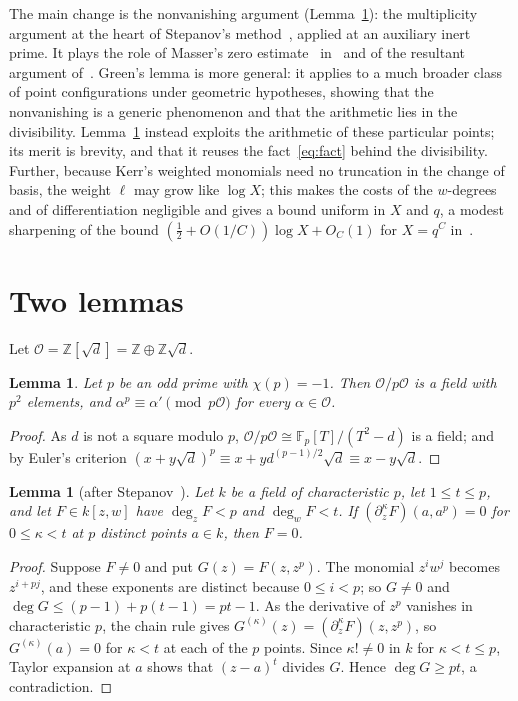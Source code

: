 \documentclass[11pt]{amsart}
\newtheorem{lemma}[theorem]{Lemma}
\newcommand{\Z}{\mathbb{Z}}
\newcommand{\F}{\mathbb{F}}
\newcommand{\cO}{\mathcal{O}}
\newcommand{\sd}{\sqrt{d}}
\begin{document}
The main change is the nonvanishing argument (Lemma~\ref{lem:stepanov}): the multiplicity argument at
the heart of Stepanov's method~\cite{Stepanov}, applied at an auxiliary inert prime. It plays the
role of Masser's zero estimate~\cite{Masser} in~\cite{Kerr} and of the resultant argument
of~\cite[Lemma~3.1, Appendix~A]{Green}. Green's lemma is more general: it applies to a much broader
class of point configurations under geometric hypotheses, showing that the nonvanishing is a generic phenomenon and that the
arithmetic lies in the divisibility. Lemma~\ref{lem:stepanov} instead exploits the arithmetic of these
particular points; its merit is brevity, and that it reuses the fact~\eqref{eq:fact} behind the
divisibility. Further, because
Kerr's weighted monomials need no truncation in the change of basis, the weight $\ell$ may grow like
$\log X$; this makes the costs of the $w$-degrees and of differentiation negligible and gives a bound
uniform in $X$ and $q$, a modest sharpening of the bound $(\frac12+O(1/C))\log X+O_C(1)$ for
$X=q^C$ in~\cite[Theorem~1.1]{Green}.

\section{Two lemmas}

Let $\cO=\Z[\sd]=\Z\oplus\Z\sd$.

\begin{lemma}\label{lem:frob}
Let $p$ be an odd prime with $\chi(p)=-1$. Then $\cO/p\cO$ is a field with $p^2$ elements, and
$\alpha^p\equiv\alpha'\pmod{p\cO}$ for every $\alpha\in\cO$.
\end{lemma}

\begin{proof}
As $d$ is not a square modulo $p$, $\cO/p\cO\cong\F_p[T]/(T^2-d)$ is a field; and by Euler's
criterion $(x+y\sd)^p\equiv x+yd^{(p-1)/2}\sd\equiv x-y\sd$.
\end{proof}

\begin{lemma}[after Stepanov~\cite{Stepanov}]\label{lem:stepanov}
Let $k$ be a field of characteristic $p$, let $1\le t\le p$, and let $F\in k[z,w]$ have
$\deg_zF<p$ and $\deg_wF<t$. If $(\partial_z^\kappa F)(a,a^p)=0$ for $0\le\kappa<t$ at $p$ distinct
points $a\in k$, then $F=0$.
\end{lemma}

\begin{proof}
Suppose $F\ne0$ and put $G(z)=F(z,z^p)$. The monomial $z^iw^j$ becomes $z^{i+pj}$, and these
exponents are distinct because $0\le i<p$; so $G\ne0$ and $\deg G\le(p-1)+p(t-1)=pt-1$. As the
derivative of $z^p$ vanishes in characteristic $p$, the chain rule gives
$G^{(\kappa)}(z)=(\partial_z^\kappa F)(z,z^p)$, so $G^{(\kappa)}(a)=0$ for $\kappa<t$ at each of the
$p$ points. Since $\kappa!\ne0$ in $k$ for $\kappa<t\le p$, Taylor expansion at $a$ shows that
$(z-a)^t$ divides $G$. Hence $\deg G\ge pt$, a contradiction.
\end{proof}
\end{document}
